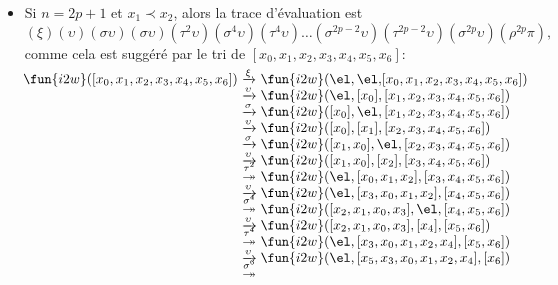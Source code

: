 \begin{itemize}

\item Si \(n = 2p+1\) et \(x_1 \prec x_2\), alors la trace
  d'évaluation est
    \begin{equation*}
    (\xi)(\upsilon)(\sigma\upsilon)(\sigma\upsilon)
    (\tau^2\upsilon)(\sigma^4\upsilon)(\tau^4\upsilon) \ldots
    (\sigma^{2p-2}\upsilon)(\tau^{2p-2}\upsilon)(\sigma^{2p}\upsilon)
    (\rho^{2p}\pi),
    \end{equation*}
    comme cela est suggéré par le tri de \([x_0,x_1,x_2,x_3,x_4,x_5,x_6]\):
    \begin{equation*}
      \!\begin{array}{@{}r@{\;}c@{\;}l@{}}
        \fun{i2w}([x_0,x_1,x_2,x_3,x_4,x_5,x_6])
        & \xrightarrow{\smash{\xi}}
        & \fun{i2w}(\el,\el,\![x_0,x_1,x_2,x_3,x_4,x_5,x_6])\\
        & \xrightarrow{\smash{\upsilon}}
        & \fun{i2w}(\el,[x_0],[x_1,x_2,x_3,x_4,x_5,x_6])\\
        & \xrightarrow{\smash{\sigma}}
        & \fun{i2w}([x_0],\el,[x_1,x_2,x_3,x_4,x_5,x_6])\\
        & \xrightarrow{\smash{\upsilon}}
        & \fun{i2w}([x_0],[x_1],[x_2,x_3,x_4,x_5,x_6])\\
        & \xrightarrow{\smash{\sigma}}
        & \fun{i2w}([x_1,x_0],\el,[x_2,x_3,x_4,x_5,x_6])\\
        & \xrightarrow{\smash{\upsilon}}
        & \fun{i2w}([x_1,x_0],[x_2],[x_3,x_4,x_5,x_6])\\
        & \stackrel{\smash{\tau^{\smash{2}}}}{\twoheadrightarrow}
        & \fun{i2w}(\el,[x_0,x_1,x_2],[x_3,x_4,x_5,x_6])\\
        & \xrightarrow{\smash{\upsilon}}
        & \fun{i2w}(\el,[x_3,x_0,x_1,x_2],[x_4,x_5,x_6])\\
        & \stackrel{\smash{\sigma^{\smash{4}}}}{\twoheadrightarrow}
        & \fun{i2w}([x_2,x_1,x_0,x_3],\el,[x_4,x_5,x_6])\\
        & \xrightarrow{\smash{\upsilon}}
        & \fun{i2w}([x_2,x_1,x_0,x_3],[x_4],[x_5,x_6])\\
        & \stackrel{\smash{\tau^{\smash{4}}}}{\twoheadrightarrow}
        & \fun{i2w}(\el,[x_3,x_0,x_1,x_2,x_4],[x_5,x_6])\\
        & \xrightarrow{\smash{\upsilon}}
        & \fun{i2w}(\el,[x_5,x_3,x_0,x_1,x_2,x_4],[x_6])\\
        & \stackrel{\smash{\sigma^{\smash{6}}}}{\twoheadrightarrow}

\end{array}
\end{equation*}
\end{itemize}
